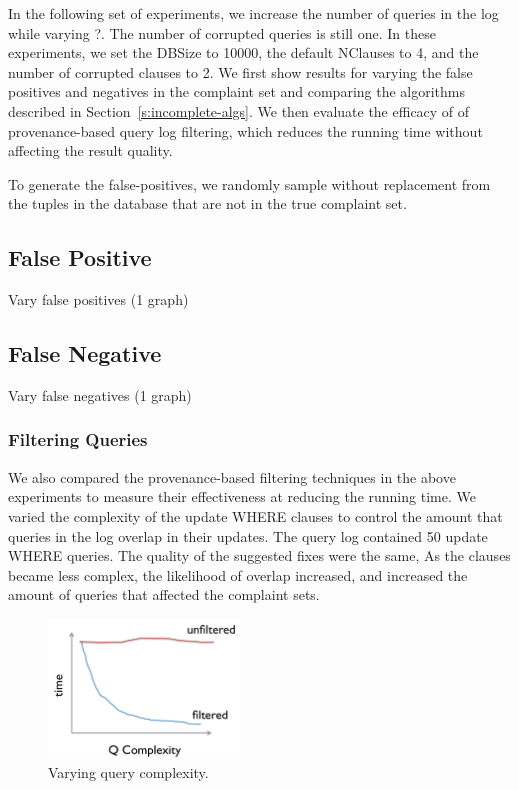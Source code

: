 {  In the following set of experiments, we increase the number of
  queries in the log while varying ?.  The number of corrupted queries
  is still one.  In these experiments, we set the DBSize to 10000,
  the default NClauses to 4, and the number of corrupted clauses to
  2.   We first show results for varying the false positives and
  negatives in the complaint set and comparing the algorithms described
  in Section~\ref{s:incomplete-algs}.  We then evaluate the efficacy
  of of provenance-based query log filtering, which reduces the running
  time without affecting the result quality.

  To generate the false-positives, we randomly sample without replacement
  from the tuples in the database that are not in the true complaint
  set.

  \subsection{False Positive}

  Vary false positives (1 graph)


  \subsection{False Negative}

  Vary false negatives (1 graph)

  \subsubsection{Filtering Queries}

  We also compared the provenance-based filtering techniques in the above experiments
  to measure their effectiveness at reducing the running time.  We varied the complexity of the update 
  WHERE clauses to control the amount that queries in the log overlap in their updates.  The query log contained 50 update WHERE queries.
  The quality of the suggested fixes were the same,  As the clauses became less complex, the likelihood 
  of overlap increased, and increased the amount of queries that affected the complaint sets.


  \begin{figure}[h]
  \centering
  \includegraphics[width = 2in]{figures/complete_qfilter_complexity}
  \caption{Varying query complexity.}
  \label{f:complete_qfilter_complexity} 
  \end{figure}



}
